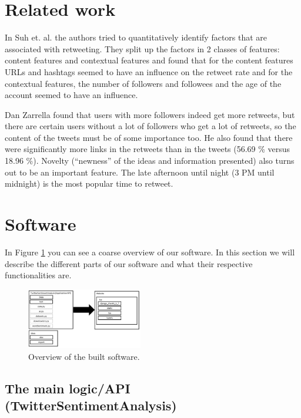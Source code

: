 \documentclass[10pt]{IEEEtran}
\begin{document}
\section{Related work}

In Suh et. al. \cite{want_to_be_retweeted} the authors tried to quantitatively identify factors that are associated with retweeting. They split up the factors in 2 classes of features: content features and contextual features and found that for the content features URLs and hashtags seemed to have an influence on the retweet rate and for the contextual features, the number of followers and followees and the age of the account seemed to have an influence. 

Dan Zarrella \cite{science_of_retweets} found that users with more followers indeed get more retweets, but there are certain users without a lot of followers who get a lot of retweets, so the content of the tweets must be of some importance too. He also found that there were significantly more links in the retweets than in the tweets (56.69 \% versus 18.96 \%). Novelty (``newness'' of the ideas and information presented) also turns out to be an important feature. The late afternoon until night (3 PM until midnight) is the most popular time to retweet. 

\section{Software}

In Figure \ref{software1} you can see a coarse overview of our software. In this section we will describe the different parts of our software and what their respective functionalities are.

\begin{figure}[h!]
\begin{center}
	\includegraphics[width=0.45\textwidth]{images/software}
\caption{Overview of the built software. \label{software1}}
\end{center}
\end{figure}
\subsection{The main logic/API (TwitterSentimentAnalysis)}
\end{document}
